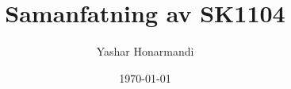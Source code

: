 \documentclass[a4paper, 11pt]{article}
\title{Samanfatning av SK1104}
\author{Yashar Honarmandi}
\date{\today}
\begin{document}
\sloppy

\maketitle

\begin{abstract}
	
\end{abstract}

\thispagestyle{empty}

\newpage

\tableofcontents

\newpage



\end{document}
